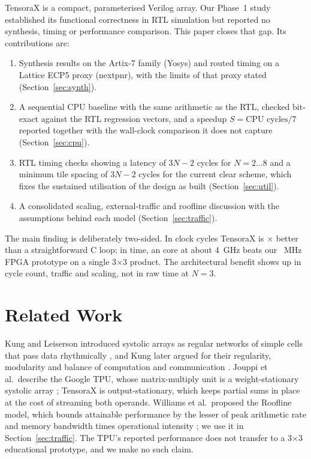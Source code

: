 \documentclass[conference]{IEEEtran}
\newcommand{\tx}{TensoraX\xspace}
\begin{document}
\tx is a compact, parameterised Verilog array. Our Phase~1 study established its functional correctness in RTL simulation but reported no synthesis, timing or performance comparison. This paper closes that gap. Its contributions are:
\begin{enumerate}
\item Synthesis results on the Artix-7 family (Yosys) and routed timing on a Lattice ECP5 proxy (nextpnr), with the limits of that proxy stated (Section~\ref{sec:synth}).
\item A sequential CPU baseline with the same arithmetic as the RTL, checked bit-exact against the RTL regression vectors, and a speedup $S=\text{CPU cycles}/7$ reported together with the wall-clock comparison it does not capture (Section~\ref{sec:cpu}).
\item RTL timing checks showing a latency of $3N-2$ cycles for $N=2\ldots8$ and a minimum tile spacing of $3N-2$ cycles for the current clear scheme, which fixes the sustained utilisation of the design as built (Section~\ref{sec:util}).
\item A consolidated scaling, external-traffic and roofline discussion with the assumptions behind each model (Section~\ref{sec:traffic}).
\end{enumerate}
The main finding is deliberately two-sided. In clock cycles \tx is \HeadS{}$\times$ better than a straightforward C loop; in time, an \CpuName core at about 4~GHz beats our \FmaxLoShort~MHz FPGA prototype on a single 3$\times$3 product. The architectural benefit shows up in cycle count, traffic and scaling, not in raw time at $N=3$.

\section{Related Work}
Kung and Leiserson introduced systolic arrays as regular networks of simple cells that pass data rhythmically \cite{kungleiserson}, and Kung later argued for their regularity, modularity and balance of computation and communication \cite{kung1982}. Jouppi et al.\ describe the Google TPU, whose matrix-multiply unit is a weight-stationary systolic array \cite{tpu}; \tx is output-stationary, which keeps partial sums in place at the cost of streaming both operands. Williams et al.\ proposed the Roofline model, which bounds attainable performance by the lesser of peak arithmetic rate and memory bandwidth times operational intensity \cite{roofline}; we use it in Section~\ref{sec:traffic}. The TPU's reported performance does not transfer to a 3$\times$3 educational prototype, and we make no such claim.
\end{document}
